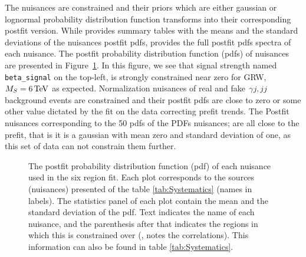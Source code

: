 The nuisances are constrained and their priors which are either gaussian or lognormal probability distribution function transforms into their corresponding postfit version. While \COMBINE provides summary tables with the means and the standard deviations of the nuisances postfit pdfs, \THETA provides the full postfit pdfs spectra of each nuisance. The postfit probability distribution function (pdfs) of nuisances are presented in Figure~\ref{fig:Postfit_Nuisances_real}. In this figure, we see that signal strength named \texttt{beta\_signal} on the top-left, is strongly constrained near zero for GRW, $M_S=6\,\text{Te\hspace{-.08em}V}$ as expected. Normalization nuisances of real \gmgm and fake $\gamma j,jj$ background events are constrained and their postfit pdfs are close to zero or some other value dictated by the fit on the data correcting prefit trends. The Postfit nuisances corresponding to the 50 pdfs of the PDFs nuisances; are all close to the prefit, that is it is a gaussian with mean zero and standard deviation of one, as this set of data can not constrain them further.

\begin{figure}[!htbp]{
\caption{The postfit probability distribution function (pdf) of each nuisance used in the six region fit.
Each plot corresponds to the sources (nuisances) presented of the table \ref{tab:Systematics} (names in labels).
The statistics panel of each plot contain the mean and the standard deviation of the pdf.
Text indicates the name of each nuisance, and the parenthesis after that indicates the regions in which this is constrained over (\ie{}, notes the correlations).
This information can also be found in table \ref{tab:Systematics}. }
\label{fig:Postfit_Nuisances_real} }
\end{figure}



